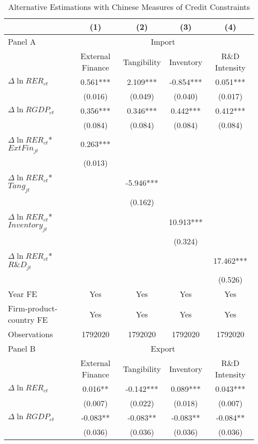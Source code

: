 \begin{table}[htbp]
	\centering
	\caption{Alternative Estimations with Chinese Measures of Credit Constraints}
	\begin{threeparttable}
	\begin{tabular}{lcccc}
		\toprule
		& (1)   & (2)   & (3)   & (4) \\
		\midrule
		Panel A & \multicolumn{4}{c}{Import} \\
		& External Finance & Tangibility & Inventory & R\&D Intensity \\
		\midrule
		$\Delta \ln RER_{ct}$ & 0.561*** & 2.109*** & -0.854*** & 0.051*** \\
		& (0.016) & (0.049) & (0.040) & (0.017) \\
		$\Delta \ln RGDP_{ct}$ & 0.356*** & 0.346*** & 0.442*** & 0.412*** \\
		& (0.084) & (0.084) & (0.084) & (0.084) \\
		$\Delta \ln RER_{ct}$*$ExtFin_{jt}$ & 0.263*** &       &       &  \\
		& (0.013) &       &       &  \\
		$\Delta \ln RER_{ct}$*$Tang_{jt}$ &       & -5.946*** &       &  \\
		&       & (0.162) &       &  \\
		$\Delta \ln RER_{ct}$*$Inventory_{jt}$ &       &       & 10.913*** &  \\
		&       &       & (0.324) &  \\
		$\Delta \ln RER_{ct}$*$R\&D_{jt}$ &       &       &       & 17.462*** \\
		&       &       &       & (0.526) \\
		Year FE  & Yes   & Yes   & Yes   & Yes \\
		Firm-product-country FE & Yes   & Yes   & Yes   & Yes \\
		Observations & 1792020 & 1792020 & 1792020 & 1792020 \\
		\midrule
		Panel B & \multicolumn{4}{c}{Export} \\
		& External Finance & Tangibility & Inventory & R\&D Intensity \\
		\midrule
		$\Delta \ln RER_{ct}$ & 0.016** & -0.142*** & 0.089*** & 0.043*** \\
		& (0.007) & (0.022) & (0.018) & (0.007) \\
		$\Delta \ln RGDP_{ct}$ & -0.083** & -0.083** & -0.083** & -0.084** \\
		& (0.036) & (0.036) & (0.036) & (0.036) \\

\end{tabular}
\end{threeparttable}
\end{table}
